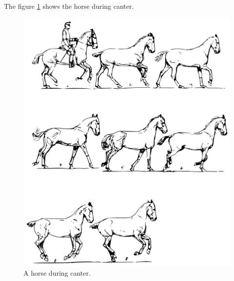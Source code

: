 The figure \ref{fig:canter} shows the horse during canter.

\begin{figure}
	\centering
	\caption{A horse during canter. \cite{Duruttya2005}}
	\label{fig:canter}
	\includegraphics[width=\linewidth]{img/cval.pdf}
\end{figure}

